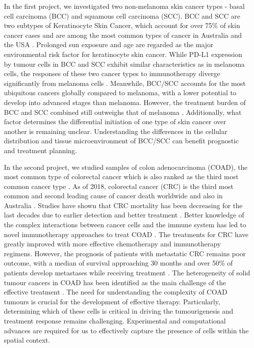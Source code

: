In the first project, we investigated two non-melanoma skin cancer types - basal cell carcinoma (BCC) and squamous cell carcinoma (SCC). BCC and SCC are two subtypes of Keratinocyte Skin Cancer, which account for over 75\% of skin cancer cases and are among the most common types of cancer in Australia and the USA \cite{rogers2015incidence, thomas2021interpretable}. Prolonged sun exposure and age are regarded as the major environmental risk factor for keratinocyte skin cancer. While PD-L1 expression by tumour cells in BCC and SCC exhibit similar characteristics as in melanoma cells, the responses of these two cancer types to immunotherapy diverge significantly from melanoma cells \cite{stonesifer2021immune}. Meanwhile, BCC/SCC accounts for the most ubiquitous cancers globally compared to melanoma, with a lower potential to develop into advanced stages than melanoma. However, the treatment burden of BCC and SCC combined still outweighs that of melanoma \cite{stonesifer2021immune, leiter2020epidemiology}. Additionally, what factor determines the differential initiation of one type of skin cancer over another is remaining unclear. Understanding the differences in the cellular distribution and tissue microenvironment of BCC/SCC can benefit prognostic and treatment planning. 

In the second project, we studied samples of colon adenocarcinoma (COAD), the most common type of colorectal cancer which is also ranked as the third most common cancer type \cite{wang2022identification, siegel2021cancer}. As of 2018, colorectal cancer (CRC) is the third most common and second leading cause of cancer death worldwide and also in Australia  \cite{siegel2021cancer, aihwcoad2018statistics}. Studies have shown that CRC mortality has been decreasing for the last decades due to earlier detection and better treatment \cite{ouakrim2015trends}. Better knowledge of the complex interactions between cancer cells and the immune system has led to novel immunotherapy approaches to treat COAD \cite{ciardiello2019immunotherapy}. The treatments for CRC have greatly improved with more effective chemotherapy and immunotherapy regimens. However, the prognosis of patients with metastatic CRC remains poor outcome, with a median of survival approaching 30 months and over  50\% of patients develop metastases while receiving treatment \cite{aihwcoad2018statistics,dulskas2020improvement, spallanzani2018immunotherapy}. The heterogeneity of solid tumour cancers in COAD has been identified as the main challenge of the effective treatment \cite{ciardiello2019immunotherapy, mathonnet2014hallmarks}. The need for understanding the complexity of COAD tumours is crucial for the development of effective therapy. Particularly, determining which of these cells is critical in driving the tumourigenesis and treatment response remains challenging. Experimental and computational advances are required for us to effectively capture the presence of cells within the spatial context.  

